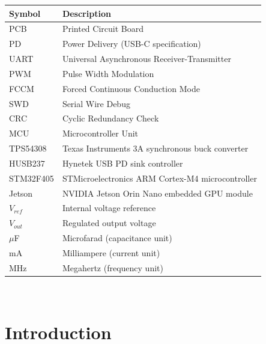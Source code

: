 \documentclass[12pt, titlepage]{article}
\begin{document}
\renewcommand{\arraystretch}{1.2}
\begin{tabular}{l l}
  \toprule
  \textbf{Symbol} & \textbf{Description}                             \\
  \midrule
  PCB             & Printed Circuit Board                            \\
  PD              & Power Delivery (USB-C specification)             \\
  UART            & Universal Asynchronous Receiver-Transmitter      \\
  PWM             & Pulse Width Modulation                           \\
  FCCM            & Forced Continuous Conduction Mode                \\
  SWD             & Serial Wire Debug                                \\
  CRC             & Cyclic Redundancy Check                          \\
  MCU             & Microcontroller Unit                             \\
  TPS54308        & Texas Instruments 3A synchronous buck converter  \\
  HUSB237         & Hynetek USB PD sink controller                   \\
  STM32F405       & STMicroelectronics ARM Cortex-M4 microcontroller \\
  Jetson          & NVIDIA Jetson Orin Nano embedded GPU module      \\
  $V_{ref}$       & Internal voltage reference                       \\
  $V_{out}$       & Regulated output voltage                         \\
  $\mu$F          & Microfarad (capacitance unit)                    \\
  mA              & Milliampere (current unit)                       \\
  MHz             & Megahertz (frequency unit)                       \\
  \bottomrule
\end{tabular}\\

\newpage


\section{Introduction}
\label{sec:intro}
\end{document}
